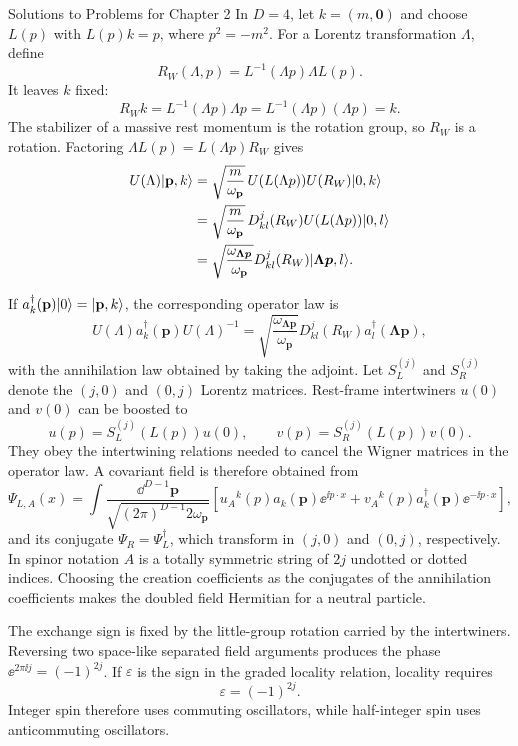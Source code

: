 \begin{bankssolutions}{Solutions to Problems for Chapter 2}
In $D=4$, let $k=(m,\mathbf0)$ and choose $L(p)$ with $L(p)k=p$, where $p^2=-m^2$. For a Lorentz transformation $\Lambda$, define
\[
  R_{W}(\Lambda,p)=L^{-1}(\Lambda p)\Lambda L(p).
\]
It leaves $k$ fixed:
\[
  R_{W}k=L^{-1}(\Lambda p)\Lambda p=L^{-1}(\Lambda p)(\Lambda p)=k.
\]
The stabilizer of a massive rest momentum is the rotation group, so $R_{W}$ is a rotation. Factoring $\Lambda L(p)=L(\Lambda p)R_{W}$ gives
\begin{align*}
  U(\Lambda)\lvert \mathbf p,k\rangle
  &=\sqrt{\frac{m}{\omega_{\mathbf p}}}\,U(L(\Lambda p))U(R_{W})\lvert 0,k\rangle\\
  &=\sqrt{\frac{m}{\omega_{\mathbf p}}}\,D^{j}_{kl}(R_{W})U(L(\Lambda p))\lvert 0,l\rangle\\
  &=\sqrt{\frac{\omega_{\boldsymbol{\Lambda p}}}{\omega_{\mathbf p}}}
    D^{j}_{kl}(R_{W})\lvert \boldsymbol{\Lambda p},l\rangle.
\end{align*}

If $a^{\dagger}_{k}(\mathbf p)\lvert 0\rangle=\lvert \mathbf p,k\rangle$, the corresponding operator law is
\[
  U(\Lambda)a^{\dagger}_{k}(\mathbf p)U(\Lambda)^{-1}
  =\sqrt{\frac{\omega_{\boldsymbol{\Lambda p}}}{\omega_{\mathbf p}}}
    D^{j}_{kl}(R_{W})a^{\dagger}_{l}(\boldsymbol{\Lambda p}),
\]
with the annihilation law obtained by taking the adjoint. Let $S_{L}^{(j)}$ and $S_{R}^{(j)}$ denote the $(j,0)$ and $(0,j)$ Lorentz matrices. Rest-frame intertwiners $u(0)$ and $v(0)$ can be boosted to
\[
  u(p)=S_{L}^{(j)}(L(p))u(0),
  \qquad v(p)=S_{R}^{(j)}(L(p))v(0).
\]
They obey the intertwining relations needed to cancel the Wigner matrices in the operator law. A covariant field is therefore obtained from
\[
  \Psi_{L,A}(x)=\int\frac{\dd^{D-1}\mathbf p}{\sqrt{(2\pi)^{D-1}2\omega_{\mathbf p}}}
  \left[u_{A}{}^{k}(p)a_{k}(\mathbf p)\ee^{\ii p\mathbin{\cdot}x}
  +v_{A}{}^{k}(p)a^{\dagger}_{k}(\mathbf p)\ee^{-\ii p\mathbin{\cdot}x}\right],
\]
and its conjugate $\Psi_{R}=\Psi_{L}^{\dagger}$, which transform in $(j,0)$ and $(0,j)$, respectively. In spinor notation $A$ is a totally symmetric string of $2j$ undotted or dotted indices. Choosing the creation coefficients as the conjugates of the annihilation coefficients makes the doubled field Hermitian for a neutral particle.

The exchange sign is fixed by the little-group rotation carried by the intertwiners. Reversing two space-like separated field arguments produces the phase $\ee^{2\pi\ii j}=(-1)^{2j}$. If $\varepsilon$ is the sign in the graded locality relation, locality requires
\[
  \varepsilon=(-1)^{2j}.
\]
Integer spin therefore uses commuting oscillators, while half-integer spin uses anticommuting oscillators.


\end{bankssolutions}
